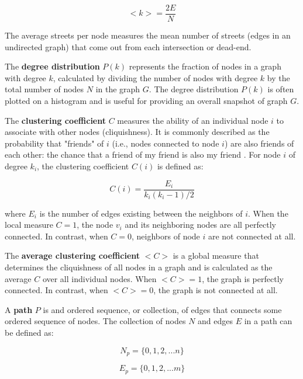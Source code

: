 \begin{equation} \label{eq:1}
<k> = \frac{2E}{N}
\end{equation}

The average streets per node measures the mean number of streets (edges in an undirected graph) that come out from each intersection or dead-end.

The \textbf{degree distribution} $P(k)$ represents the fraction of nodes in a graph with degree $k$, calculated by dividing the number of nodes with degree $k$ by the total number of nodes $N$ in the graph $G$. The degree distribution $P(k)$ is often plotted on a histogram and is useful for providing an overall snapshot of graph $G$.

The \textbf{clustering coefficient} $C$ measures the ability of an individual node $i$ to associate with other nodes (cliquishness). It is commonly described as the probability that "friends" of $i$ (i.e., nodes connected to node $i$) are also friends of each other: the chance that a friend of my friend is also my friend \cite{watts_strogatz_1998}. For node $i$ of degree $k_i$, the clustering coefficient $C(i)$ is defined as:

\begin{equation} \label{eq:2}
	C(i) = \frac{E_i}{k_i(k_i - 1)/2}
\end{equation}

where $E_i$ is the number of edges existing between the neighbors of $i$. When the local measure $C = 1$, the node $v_i$ and its neighboring nodes are all perfectly connected. In contrast, when $C = 0$, neighbors of node $i$ are not connected at all.

The \textbf{average clustering coefficient} $<C>$ is a global measure that determines the cliquishness of all nodes in a graph and is calculated as the average $C$ over all individual nodes. When $<C> = 1$, the graph is perfectly connected. In contrast, when $<C> = 0$, the graph is not connected at all.

A \textbf{path} $P$ is and ordered sequence, or collection, of edges that connects some ordered sequence of nodes. The collection of nodes $N$ and edges $E$ in a path can be defined as:

\begin{equation} \label{eq:3}
N_p = \{0,1,2,...n\}
\end{equation}

\begin{equation} \label{eq:4}
E_p = \{0,1,2,...m\}
\end{equation}

